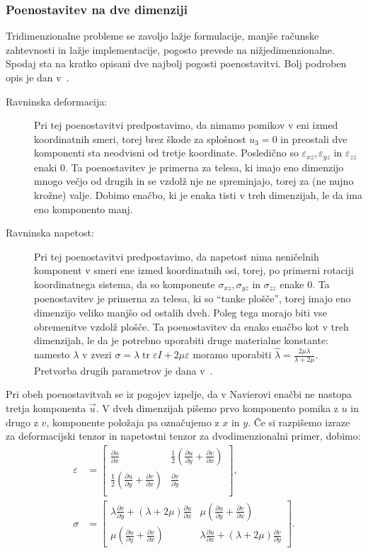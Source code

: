 \documentclass[12pt,a4paper,twoside]{article}
\theoremstyle{definition} %
\theoremstyle{plain} %
\numberwithin{equation}{section}
\newcommand{\eps}{\varepsilon}
\newcommand{\dpar}[2]{\ensuremath{\frac{\partial #1}{\partial #2}}}
\newcommand{\vu}{\vec{u}}
\newcommand{\ts}{\sigma}
\DeclareMathOperator{\tr}{tr}
\begin{document}
\subsubsection{Poenostavitev na dve dimenziji}
Tridimenzionalne probleme se zavoljo lažje formulacije, manjše računske zahtevnosti in lažje
implementacije, pogosto prevede na nižjedimenzionalne. Spodaj sta na
kratko opisani dve najbolj pogosti poenostavitvi. Bolj podroben opis je dan
v~\cite[str.~260--278]{slaughter2012linearized}.

\begin{description}
  \item[Ravninska deformacija:]
    Pri tej poenostavitvi predpostavimo, da nimamo pomikov v eni izmed koordinatnih smeri, torej
    brez škode za splošnost $u_3 = 0$ in preostali dve komponenti sta neodvisni od tretje
    koordinate. Posledično so $\eps_{xz}, \eps_{yz}$ in $\eps_{zz}$ enaki 0. Ta poenostavitev je
    primerna za telesa, ki imajo eno dimenzijo mnogo večjo od drugih in se vzdolž nje ne
    spreminjajo, torej za (ne nujno krožne) valje. Dobimo enačbo, ki je enaka tisti v
    treh dimenzijah, le da ima eno komponento manj.
  \item[Ravninska napetost:]
    Pri tej poenostavitvi predpostavimo, da napetost nima neničelnih komponent v smeri ene izmed
    koordinatnih osi, torej, po primerni rotaciji koordinatnega sistema, da so komponente $\ts_{xz},
    \ts_{yz}$ in $\ts_{zz}$ enake 0. Ta poenostavitev je primerna za telesa, ki so ``tanke plošče'',
    torej imajo eno dimenzijo veliko manjšo od ostalih dveh. Poleg tega morajo biti vse obremenitve
    vzdolž plošče. Ta poenostavitev da enako enačbo kot v treh dimenzijah, le da je potrebno
    uporabiti druge materialne konstante: namesto $\lambda$ v zvezi $\sigma = \lambda \tr\eps I + 2
    \mu \eps$ moramo uporabiti $\hat\lambda = \frac{2 \mu \lambda}{\lambda + 2 \mu}$. Pretvorba
    drugih parametrov je dana v~\cite[str.\ 276, tabela 7.1]{slaughter2012linearized}.
\end{description}

Pri obeh poenostavitvah se iz pogojev izpelje, da v Navierovi enačbi ne nastopa tretja komponenta
$\vu$. V dveh dimenzijah pišemo prvo komponento pomika z $u$ in drugo z $v$, komponente položaja pa
označujemo z $x$ in $y$. Če si razpišemo izraze za deformacijski tenzor in napetostni tenzor za
dvodimenzionalni primer, dobimo:
\begin{align}
  \eps &=
  \begin{bmatrix}
    \dpar{u}{x} & \frac12(\dpar{u}{y} + \dpar{v}{x}) \\
    \frac12(\dpar{u}{y} + \dpar{v}{x}) & \dpar{v}{y} \\
  \end{bmatrix},
  \\
  \ts &=
  \begin{bmatrix}
    \lambda \dpar{v}{y} + (\lambda+2\mu) \dpar{u}{x} &
    \mu(\dpar{u}{y} + \dpar{v}{x}) \\
    \mu(\dpar{u}{y} + \dpar{v}{x}) &
    \lambda \dpar{u}{x} + (\lambda+2\mu) \dpar{v}{y}
  \end{bmatrix}.
\end{align}
\end{document}
